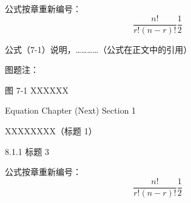 \documentclass[UTF8, scheme=chinese, openany, oneside]{ctexbook}
\begin{document}
\vspace{1.2cm}
\noindent \hspace{2em} 公式按章重新编号：
\vspace{0.6cm}
\begin{equation}
\frac{n!}{r!(n-r)!} \frac{1}{2} \tag{7-1} \label{eq:7-1}
\end{equation}

\vspace{1.8cm}
\noindent \hspace{2em} 公式（7-1）说明，…………（公式在正文中的引用）
\vspace{3.5cm}

\noindent \hspace{2em} 图题注：

\vspace{0.8cm}

\begin{center}
     图 7-1 \quad XXXXXX
\end{center}
\vfill
\begin{center} {\color{white} Equation Chapter (Next) Section 1} \end{center}


\clearpage
\setcounter{chapter}{7}
\setcounter{page}{17}


\vspace{1cm}
\begin{center}
{ \quad XXXXXXXX（标题 1）}
\end{center}
\vspace{0.8cm}


\vspace{0.3cm}
\noindent \hspace{2em} { 8.1.1 \quad 标题 3}

\vspace{1.2cm}
\noindent \hspace{2em} 公式按章重新编号：
\vspace{0.6cm}
\begin{equation}
\frac{n!}{r!(n-r)!} \frac{1}{2} \tag{8-1} \label{eq:8-1}
\end{equation}
\end{document}
